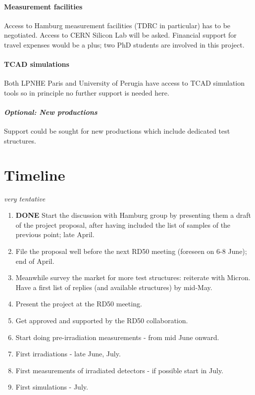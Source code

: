 \documentclass[dvips,12pt]{article}
\begin{document}
\paragraph{Measurement facilities} Access to Hamburg measurement facilities (TDRC in 
particular) has to be negotiated. Access to CERN Silicon Lab will be asked. 
Financial support for travel expenses would be a plus; two 
PhD students are involved in this project.
\paragraph{TCAD simulations}Both LPNHE Paris and University of Perugia have access to 
TCAD simulation tools so in principle no further support is needed here.
\paragraph{{\it Optional: New productions}}Support could be sought for new 
productions which include dedicated test structures.


\section{Timeline}
\label{sec:timeline}
{\it very tentative}

\begin{enumerate}[1)]
\item  {\bf DONE} Start the discussion with Hamburg group by presenting them a draft of the project 
proposal, 
after having included the list of samples of the previous point; late April.
\item File the proposal well before the next RD50 meeting (foreseen on 6-8 June);  end of 
April.
\item Meanwhile survey the market for more test structures: reiterate with Micron. 
Have a first list of replies (and available structures) by mid-May.
\item Present the project at the RD50 meeting.
\item Get approved and supported by the RD50 collaboration. %
\item Start doing pre-irradiation measurements - from mid June onward.
\item First irradiations - late June, July.
\item First measurements of irradiated detectors - if possible start in July.
\item First simulations - July.
\end{enumerate}

\newpage



\end{document}
